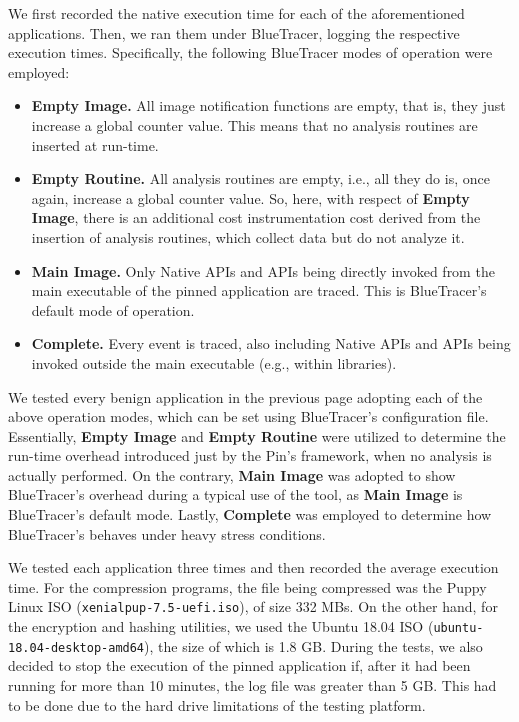 We first recorded the native execution time for each of the aforementioned applications. Then, we ran them under BlueTracer, logging the respective execution times. Specifically, the following BlueTracer modes of operation were employed:

\begin{itemize}
\item \textbf{Empty Image.} All image notification functions are empty, that is, they just increase a global counter value. This means that no analysis routines are inserted at run-time. 
\item \textbf{Empty Routine.} All analysis routines are empty, i.e., all they do is, once again, increase a global counter value. So, here, with respect of \textbf{Empty Image}, there is an additional cost instrumentation cost derived from the insertion of analysis routines, which collect data but do not analyze it.  
\item \textbf{Main Image.} Only Native APIs and APIs being directly invoked from the main executable of the pinned application are traced. This is BlueTracer's default mode of operation. 
\item \textbf{Complete.} Every event is traced, also including Native APIs and APIs being invoked outside the main executable (e.g., within libraries).
\end{itemize}

We tested every benign application in the previous page adopting each of the above operation modes, which can be set using BlueTracer's configuration file. Essentially, \textbf{Empty Image} and \textbf{Empty Routine} were utilized to determine the run-time overhead introduced just by the Pin's framework, when no analysis is actually performed. On the contrary, \textbf{Main Image} was adopted to show BlueTracer's overhead during a typical use of the tool, as \textbf{Main Image} is BlueTracer's default mode. Lastly, \textbf{Complete} was employed to determine how BlueTracer's behaves under heavy stress conditions.

We tested each application three times and then recorded the average execution time. For the compression programs, the file being compressed was the Puppy Linux ISO (\texttt{xenialpup-7.5-uefi.iso}), of size 332 MBs. On the other hand, for the encryption and hashing utilities, we used the Ubuntu 18.04 ISO (\texttt{ubuntu-18.04-desktop-amd64}), the size of which is 1.8 GB. During the tests, we also decided to stop the execution of the pinned application if, after it had been running for more than 10 minutes, the log file was greater than 5 GB. This had to be done due to the hard drive limitations of the testing platform.      

